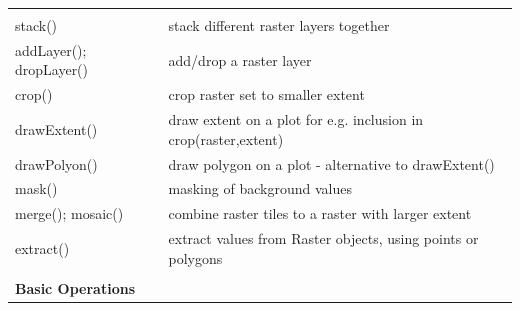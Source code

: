 \documentclass[10pt,landscape]{article}
\begin{document}
\begin{multicols}{3}
\begin{tabular}{@{}p{\the\MyLen}%
                @{}p{\linewidth-\the\MyLen}@{}}
 &  \\                
stack() & stack different raster layers together \\
addLayer(); dropLayer()	& add/drop a raster layer\\
crop() 		& crop raster set to smaller extent  \\
drawExtent()	& draw extent on a plot for e.g. inclusion in crop(raster,extent)\\
drawPolyon()	& draw polygon on a plot - alternative to drawExtent()\\
mask() 		& masking of background values \\
merge(); mosaic() & combine raster tiles to a raster with larger extent \\
extract() 	& extract values from Raster objects, using points or polygons  \\
& \\
\textbf{Basic Operations} & \\


\end{tabular}
\end{multicols}
\end{document}

